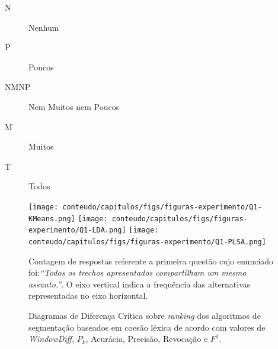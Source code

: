 \begin{center}
    \begin{minipage}{0.5\textwidth}
		\begin{description} \tiny
			\item[N] Nenhum
			\item[P] Poucos
			\item[NMNP] Nem Muitos nem Poucos
			\item[M] Muitos
			\item[T] Todos
		\end{description}
    \end{minipage}
  \end{center}



\begin{figure}[!h] \centering     %
		\texttt{[image: conteudo/capitulos/figs/figuras-experimento/Q1-KMeans.png]}
		\texttt{[image: conteudo/capitulos/figs/figuras-experimento/Q1-LDA.png]}
		\texttt{[image: conteudo/capitulos/figs/figuras-experimento/Q1-PLSA.png]}
	\caption{Contagem de respostas referente a primeira questão cujo enunciado foi:\textit{``Todos os trechos apresentados compartilham um mesmo assunto.''}. O eixo vertical indica a frequência das alternativas representadas no eixo horizontal. }
	\label{fig:Q1}
\end{figure}












\begin{figure}[!h]
	\centering     %


		\caption{Diagramas de Diferença Crítica sobre \textit{ranking} dos algoritmos de segmentação baseados em coesão léxica de acordo com valores de \textit{WindowDiff}, $P_k$, Acurácia, Precisão, Revocação e $F^1$.}
	\label{fig:CDs}
\end{figure}







